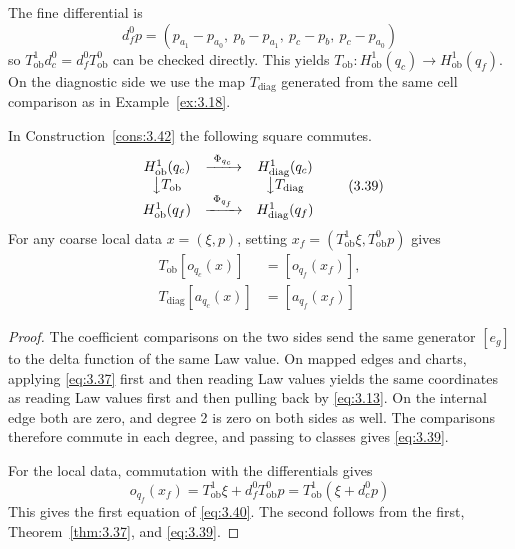 \begin{construction}
The fine differential is
\begin{equation*}
d_f^0p=
(p_{a_1}-p_{a_0},\
p_b-p_{a_1},\
p_c-p_b,\
p_c-p_{a_0})
\tag{3.38}\label{eq:3.38}
\end{equation*}
so $T_{\mathrm{ob}}^1d_c^0=d_f^0T_{\mathrm{ob}}^0$ can be checked directly.
This yields $T_{\mathrm{ob}}:H^1_{\mathrm{ob}}(q_c)\to H^1_{\mathrm{ob}}(q_f)$.
On the diagnostic side we use the map $T_{\mathrm{diag}}$ generated from the same
cell comparison as in Example~\ref{ex:3.18}.

\end{construction}

\begin{theorem}\label{thm:3.43}

In Construction~\ref{cons:3.42} the following square commutes.
\begin{equation*}
\begin{array}{ccc}
H^1_{\mathrm{ob}}(q_c)&\xrightarrow{\ \Phi_{q_c}\ }&
H^1_{\mathrm{diag}}(q_c)\\
\big\downarrow T_{\mathrm{ob}}&&\big\downarrow T_{\mathrm{diag}}\\
H^1_{\mathrm{ob}}(q_f)&\xrightarrow{\ \Phi_{q_f}\ }&
H^1_{\mathrm{diag}}(q_f)
\end{array}
\tag{3.39}\label{eq:3.39}
\end{equation*}
For any coarse local data $x=(\xi,p)$, setting
$x_f=(T_{\mathrm{ob}}^1\xi,T_{\mathrm{ob}}^0p)$ gives
\begin{equation*}
\begin{aligned}
T_{\mathrm{ob}}[o_{q_c}(x)]&=[o_{q_f}(x_f)],\\
T_{\mathrm{diag}}[a_{q_c}(x)]&=[a_{q_f}(x_f)]
\end{aligned}
\tag{3.40}\label{eq:3.40}
\end{equation*}
\end{theorem}

\begin{proof}

The coefficient comparisons on the two sides send the same generator $[e_g]$ to the
delta function of the same Law value.
On mapped edges and charts, applying \eqref{eq:3.37} first and then reading Law
values yields the same coordinates as reading Law values first and then pulling back
by \eqref{eq:3.13}.
On the internal edge both are zero, and degree 2 is zero on both sides as well.
The comparisons therefore commute in each degree, and passing to classes gives
\eqref{eq:3.39}.

For the local data, commutation with the differentials gives
\begin{equation*}
o_{q_f}(x_f)
=T_{\mathrm{ob}}^1\xi+d_f^0T_{\mathrm{ob}}^0p
=T_{\mathrm{ob}}^1(\xi+d_c^0p)
\tag{3.41}\label{eq:3.41}
\end{equation*}
This gives the first equation of \eqref{eq:3.40}.
The second follows from the first, Theorem~\ref{thm:3.37}, and \eqref{eq:3.39}.

\end{proof}

